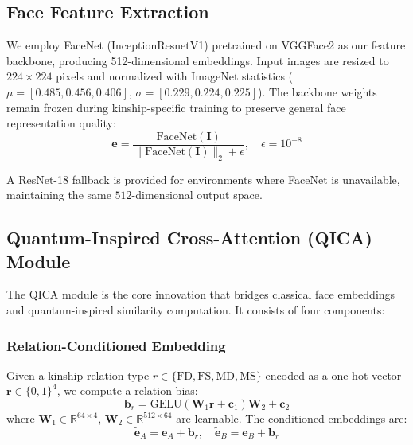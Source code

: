 \documentclass[journal,12pt]{IEEEtran}
\begin{document}
\subsection{Face Feature Extraction}
\label{sec:feature_extraction}

We employ FaceNet (InceptionResnetV1) pretrained on VGGFace2 as our feature
backbone, producing 512-dimensional embeddings. Input images are resized to
$224 \times 224$ pixels and normalized with ImageNet statistics
($\mu = [0.485, 0.456, 0.406]$, $\sigma = [0.229, 0.224, 0.225]$).
The backbone weights remain frozen during kinship-specific training to
preserve general face representation quality:
\begin{equation}
    \mathbf{e} = \frac{\text{FaceNet}(\mathbf{I})}{\|\text{FaceNet}(\mathbf{I})\|_2 + \epsilon}, \quad \epsilon = 10^{-8}
\end{equation}

A ResNet-18 fallback is provided for environments where FaceNet is
unavailable, maintaining the same $512$-dimensional output space.

\subsection{Quantum-Inspired Cross-Attention (QICA) Module}
\label{sec:qica}

The QICA module is the core innovation that bridges classical face
embeddings and quantum-inspired similarity computation. It consists of
four components:

\subsubsection{Relation-Conditioned Embedding}
Given a kinship relation type $r \in \{\text{FD},\text{FS},\text{MD},\text{MS}\}$
encoded as a one-hot vector $\mathbf{r} \in \{0,1\}^4$, we compute a
relation bias:
\begin{equation}
    \mathbf{b}_r = \text{GELU}(\mathbf{W}_1 \mathbf{r} + \mathbf{c}_1) \mathbf{W}_2 + \mathbf{c}_2
    \label{eq:rel_embed}
\end{equation}
where $\mathbf{W}_1 \in \mathbb{R}^{64 \times 4}$, $\mathbf{W}_2 \in
\mathbb{R}^{512 \times 64}$ are learnable. The conditioned embeddings are:
\begin{equation}
    \tilde{\mathbf{e}}_A = \mathbf{e}_A + \mathbf{b}_r, \quad
    \tilde{\mathbf{e}}_B = \mathbf{e}_B + \mathbf{b}_r
\end{equation}
\end{document}
